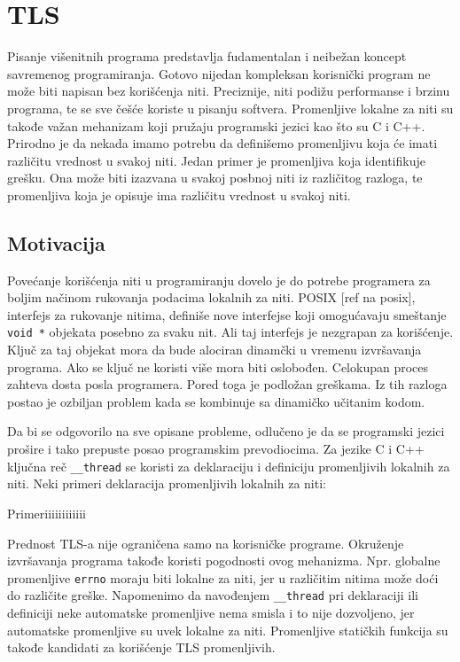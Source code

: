 \documentclass[12pt,oneside]{memoir}
\begin{document}
\chapter{TLS}
\label{chp:TLS}

Pisanje višenitnih programa predstavlja fudamentalan i neibežan koncept savremenog programiranja. Gotovo nijedan kompleksan korisnički program ne može biti napisan bez korišćenja niti. Preciznije, niti podižu performanse i brzinu programa, te se sve češće koriste u pisanju softvera. Promenljive lokalne za niti su takođe važan mehanizam koji pružaju programski jezici kao što su C i C++. Prirodno je da nekada imamo potrebu da definišemo promenljivu koja će imati različitu vrednost u svakoj niti. Jedan primer je promenljiva koja identifikuje grešku. Ona može biti izazvana u svakoj posbnoj niti iz različitog razloga, te promenljiva koja je opisuje ima različitu vrednost u svakoj niti.

\section{Motivacija}

Povećanje korišćenja niti u programiranju dovelo je do potrebe programera za boljim načinom rukovanja podacima lokalnih za niti. POSIX [ref na posix], interfejs za rukovanje nitima, definiše nove interfejse koji omogućavaju smeštanje \texttt{void *} objekata posebno za svaku nit. Ali taj interfejs je nezgrapan za korišćenje. Ključ za taj objekat mora da bude alociran dinamčki u vremenu izvršavanja programa. Ako se ključ ne koristi više mora biti oslobođen. Celokupan proces zahteva dosta posla programera. Pored toga je podložan greškama. Iz tih razloga postao je ozbiljan problem kada se kombinuje sa dinamičko učitanim kodom.

Da bi se odgovorilo na sve opisane probleme, odlučeno je da se programski jezici prošire i tako prepuste posao programskim prevodiocima. Za jezike C i C++ ključna reč \texttt{\_\_thread} se koristi za deklaraciju i definiciju promenljivih lokalnih za niti. Neki primeri deklaracija promenljivih lokalnih za niti:

Primeriiiiiiiiiiii

Prednost TLS-a nije ograničena samo na korisničke programe. Okruženje izvršavanja programa takođe koristi pogodnosti ovog mehanizma. Npr. globalne promenljive \texttt{errno} moraju biti lokalne za niti, jer u različitim nitima može doći do različite greške. Napomenimo da navođenjem \texttt{\_\_thread} pri deklaraciji ili definiciji neke automatske promenljive nema smisla i to nije dozvoljeno, jer automatske promenljive su uvek lokalne za niti. Promenljive statičkih funkcija su takođe kandidati za korišćenje TLS promenljivih.
\end{document}
